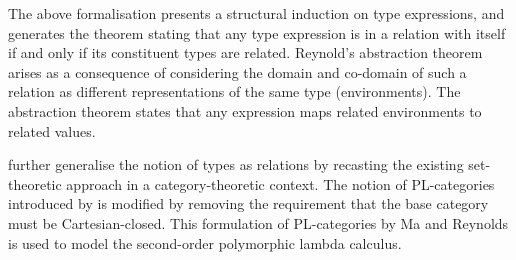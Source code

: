 \documentclass[11pt,openright,hidelinks,a4paper]{article}
\begin{document}
The above formalisation presents a structural induction on type expressions, and generates the theorem stating that any type expression is in a relation with itself if and only if its constituent types are related. Reynold's abstraction theorem arises as a consequence of considering the domain and co-domain of such a relation as different representations of the same type (environments). The abstraction theorem states that any expression maps related environments to related values.

 further generalise the notion of types as relations by recasting the existing set-theoretic approach in a category-theoretic context. The notion of PL-categories introduced by  is modified by removing the requirement that the base category must be Cartesian-closed. This formulation of PL-categories by Ma and Reynolds is used to model the second-order polymorphic lambda calculus.
\end{document}
